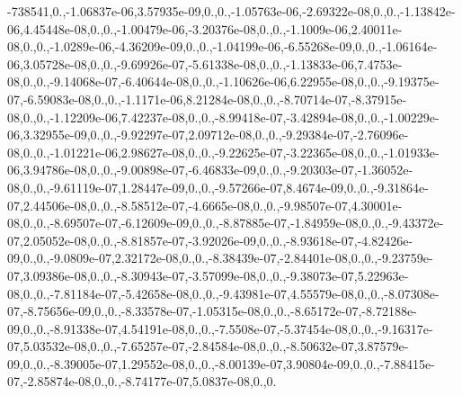 \begin{DoxyCompactItemize}
-738541,0.,-\/1.\-06837e-\/06,3.\-57935e-\/09,0.,0.,-\/1.\-05763e-\/06,-\/2.\-69322e-\/08,0.,0.,-\/1.\-13842e-\/06,4.\-45448e-\/08,0.,0.,-\/1.\-00479e-\/06,-\/3.\-20376e-\/08,0.,0.,-\/1.\-1009e-\/06,2.\-40011e-\/08,0.,0.,-\/1.\-0289e-\/06,-\/4.\-36209e-\/09,0.,0.,-\/1.\-04199e-\/06,-\/6.\-55268e-\/09,0.,0.,-\/1.\-06164e-\/06,3.\-05728e-\/08,0.,0.,-\/9.\-69926e-\/07,-\/5.\-61338e-\/08,0.,0.,-\/1.\-13833e-\/06,7.\-4753e-\/08,0.,0.,-\/9.\-14068e-\/07,-\/6.\-40644e-\/08,0.,0.,-\/1.\-10626e-\/06,6.\-22955e-\/08,0.,0.,-\/9.\-19375e-\/07,-\/6.\-59083e-\/08,0.,0.,-\/1.\-1171e-\/06,8.\-21284e-\/08,0.,0.,-\/8.\-70714e-\/07,-\/8.\-37915e-\/08,0.,0.,-\/1.\-12209e-\/06,7.\-42237e-\/08,0.,0.,-\/8.\-99418e-\/07,-\/3.\-42894e-\/08,0.,0.,-\/1.\-00229e-\/06,3.\-32955e-\/09,0.,0.,-\/9.\-92297e-\/07,2.\-09712e-\/08,0.,0.,-\/9.\-29384e-\/07,-\/2.\-76096e-\/08,0.,0.,-\/1.\-01221e-\/06,2.\-98627e-\/08,0.,0.,-\/9.\-22625e-\/07,-\/3.\-22365e-\/08,0.,0.,-\/1.\-01933e-\/06,3.\-94786e-\/08,0.,0.,-\/9.\-00898e-\/07,-\/6.\-46833e-\/09,0.,0.,-\/9.\-20303e-\/07,-\/1.\-36052e-\/08,0.,0.,-\/9.\-61119e-\/07,1.\-28447e-\/09,0.,0.,-\/9.\-57266e-\/07,8.\-4674e-\/09,0.,0.,-\/9.\-31864e-\/07,2.\-44506e-\/08,0.,0.,-\/8.\-58512e-\/07,-\/4.\-6665e-\/08,0.,0.,-\/9.\-98507e-\/07,4.\-30001e-\/08,0.,0.,-\/8.\-69507e-\/07,-\/6.\-12609e-\/09,0.,0.,-\/8.\-87885e-\/07,-\/1.\-84959e-\/08,0.,0.,-\/9.\-43372e-\/07,2.\-05052e-\/08,0.,0.,-\/8.\-81857e-\/07,-\/3.\-92026e-\/09,0.,0.,-\/8.\-93618e-\/07,-\/4.\-82426e-\/09,0.,0.,-\/9.\-0809e-\/07,2.\-32172e-\/08,0.,0.,-\/8.\-38439e-\/07,-\/2.\-84401e-\/08,0.,0.,-\/9.\-23759e-\/07,3.\-09386e-\/08,0.,0.,-\/8.\-30943e-\/07,-\/3.\-57099e-\/08,0.,0.,-\/9.\-38073e-\/07,5.\-22963e-\/08,0.,0.,-\/7.\-81184e-\/07,-\/5.\-42658e-\/08,0.,0.,-\/9.\-43981e-\/07,4.\-55579e-\/08,0.,0.,-\/8.\-07308e-\/07,-\/8.\-75656e-\/09,0.,0.,-\/8.\-33578e-\/07,-\/1.\-05315e-\/08,0.,0.,-\/8.\-65172e-\/07,-\/8.\-72188e-\/09,0.,0.,-\/8.\-91338e-\/07,4.\-54191e-\/08,0.,0.,-\/7.\-5508e-\/07,-\/5.\-37454e-\/08,0.,0.,-\/9.\-16317e-\/07,5.\-03532e-\/08,0.,0.,-\/7.\-65257e-\/07,-\/2.\-84584e-\/08,0.,0.,-\/8.\-50632e-\/07,3.\-87579e-\/09,0.,0.,-\/8.\-39005e-\/07,1.\-29552e-\/08,0.,0.,-\/8.\-00139e-\/07,3.\-90804e-\/09,0.,0.,-\/7.\-88415e-\/07,-\/2.\-85874e-\/08,0.,0.,-\/8.\-74177e-\/07,5.\-0837e-\/08,0.,0.
\end{DoxyCompactItemize}

